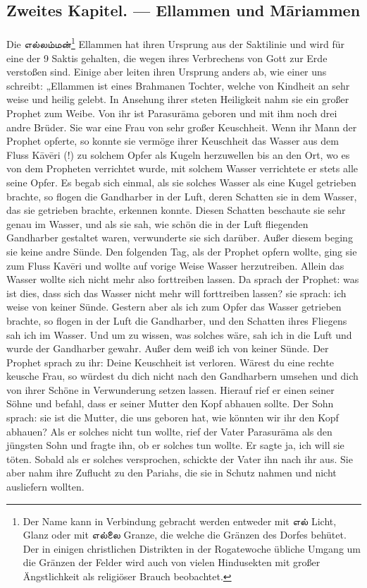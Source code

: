 \documentclass{article}
\newcommand{\TamilText}[1]{\texttamil{#1}}
\newcommand{\tam}[1]{\TamilText{#1}}
\begin{document}
\clearpage
\subsection{Zweites Kapitel. — Ellammen und M\={a}riammen}
\paragraph{}
Die \tam{எல்லம்மன்}\footnote{Der Name kann in Verbindung gebracht werden entweder mit \tam{எல்} Licht, Glanz oder mit \tam{எல்லை} Granze, die welche die Gränzen des Dorfes behütet. Der in einigen christlichen Distrikten in der Rogatewoche übliche Umgang um die Gränzen der Felder wird auch von vielen Hindusekten mit großer Ängstlichkeit als religiöser Brauch beobachtet.} Ellammen hat ihren Ursprung aus der Saktilinie und wird für eine der 9 Saktis gehalten, die wegen ihres Verbrechens von Gott zur Erde verstoßen sind. Einige aber leiten ihren Ursprung anders ab, wie einer uns schreibt: „Ellammen ist eines Brahmanen Tochter, welche von Kindheit an sehr weise und heilig gelebt. In Ansehung ihrer steten Heiligkeit nahm sie ein großer Prophet zum Weibe. Von ihr ist Parasur\={a}ma geboren und mit ihm noch drei andre Brüder. Sie war eine Frau von sehr großer Keuschheit. Wenn ihr Mann der Prophet opferte, so konnte sie vermöge ihrer Keuschheit das Wasser aus dem Fluss K\={a}v\={e}ri (!) zu solchem Opfer als Kugeln herzuwellen bis an den Ort, wo es von dem Propheten verrichtet wurde, mit solchem Wasser verrichtete er stets alle seine Opfer. Es begab sich einmal, als sie solches Wasser als eine Kugel getrieben brachte, so flogen die Gandharber in der Luft, deren Schatten sie in dem Wasser, das sie getrieben brachte, erkennen konnte. Diesen Schatten beschaute sie sehr genau im Wasser, und als sie sah, wie schön die in der Luft fliegenden Gandharber gestaltet waren, verwunderte sie sich darüber. Außer diesem beging sie keine andre Sünde. Den folgenden Tag, als der Prophet opfern wollte, ging sie zum Fluss Kav\={e}ri und wollte auf vorige Weise Wasser herzutreiben. Allein das Wasser wollte sich nicht mehr also forttreiben lassen. Da sprach der Prophet: was ist dies, dass sich das Wasser nicht mehr will forttreiben lassen? sie sprach: ich weise von keiner Sünde. Gestern aber als ich zum Opfer das Wasser getrieben brachte, so flogen in der Luft die Gandharber, und den Schatten ihres Fliegens sah ich im Wasser. Und um zu wissen, was solches wäre, sah ich in die Luft und wurde der Gandharber gewahr. Außer dem weiß ich von keiner Sünde. Der Prophet sprach zu ihr: Deine Keuschheit ist verloren. Wärest du eine rechte keusche Frau, so würdest du dich nicht nach den Gandharbern umsehen und dich von ihrer Schöne in Verwunderung setzen lassen. Hierauf rief er einen seiner Söhne und befahl, dass er seiner Mutter den Kopf abhauen sollte. Der Sohn sprach: sie ist die Mutter, die uns geboren hat, wie könnten wir ihr den Kopf abhauen? Als er solches nicht tun wollte, rief der Vater Parasur\={a}ma als den jüngsten Sohn und fragte ihn, ob er solches tun wollte. Er sagte ja, ich will sie töten. Sobald als er solches versprochen, schickte der Vater ihn nach ihr aus. Sie aber nahm ihre Zuflucht zu den Pariahs, die sie in Schutz nahmen und nicht ausliefern wollten. 
\end{document}
